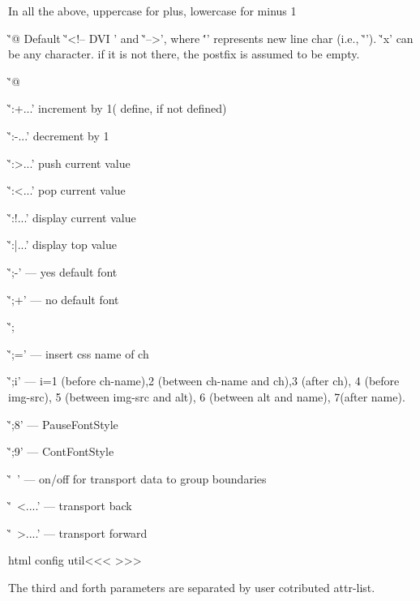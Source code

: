 {{{In all the above, uppercase for plus, lowercase for minus 1

\item \`'@%
    Default \`'<!-- DVI ' and \`'\n-->', where \''\n' represents
    new line char (i.e., \`'\Hnewline').
    \`'x' can be any character. if it is not there, 
    the postfix is assumed to be empty.
\item \`'@%


\item \`':+...'  increment by 1( define, if not defined)
\item \`':-...'  decrement by 1
\item \`':>...'  push current value
\item \`':<...'  pop current value
\item \`':!...'   display current value
\item \`':|...'   display top value

\item \`';-' --- yes default font
\item \`';+' --- no default font
\item \`';%
\item \`';=' --- insert css name of ch


\item \`';i' ---  i=1 (before ch-name),2 (between ch-name and ch),3
    (after ch), 4 (before img-src), 5 (between img-src and alt), 6
    (between alt and name), 7(after name).
\item \`';8' --- PauseFontStyle
\item \`';9' --- ContFontStyle

\item \`'~' --- on/off for transport data to group boundaries
\item \`'~<....' --- transport back
\item \`'~>....' --- transport forward

\EndVerbatim









\<html config util\><<<
>>>


The third and forth parameters are separated by user
cotributed attr-list.




}}}
